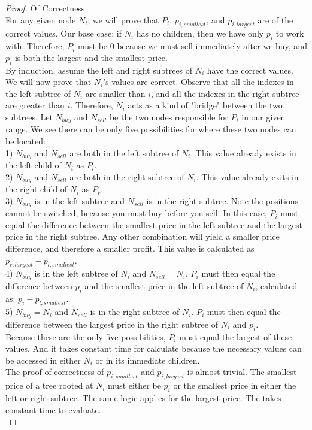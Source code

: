 \documentclass{article}
\theoremstyle{casestyle}
\begin{document}
\begin{proof} Of Correctness\\
  For any given node $N_i$, we will prove that $P_i$, $p_{i, smallest}$, and $p_{i, largest}$ are of the correct values. Our base case: if $N_i$ has no children, then we have only $p_i$ to work with. Therefore, $P_i$ must be $0$ because we must sell immediately after we buy, and $p_i$ is both the largest and the smallest price.\\

  By induction, assume the left and right subtrees of $N_i$ have the correct values. We will now prove that $N_i$'s values are correct. Observe that all the indexes in the left subtree of $N_i$ are smaller than $i$, and all the indexes in the right subtree are greater than $i$. Therefore, $N_i$ acts as a kind of "bridge" between the two subtrees. Let $N_{buy}$ and $N_{sell}$ be the two nodes responsible for $P_i$ in our given range. We see there can be only five possibilities for where these two nodes can be located:\\

  1) $N_{buy}$ and $N_{sell}$ are both in the left subtree of $N_i$. This value already exists in the left child of $N_i$ as $P_l$.\\
  2) $N_{buy}$ and $N_{sell}$ are both in the right subtree of $N_i$. This value already exits in the right child of $N_i$ as $P_r$.\\
  3) $N_{buy}$ is in the left subtree and $N_{sell}$ is in the right subtree. Note the positions cannot be switched, because you must buy before you sell. In this case, $P_i$ must equal the difference between the smallest price in the left subtree and the largest price in the right subtree. Any other combination will yield a smaller price difference, and therefore a smaller profit. This value is calculated as $p_{r, largest} - p_{l, smallest}$.\\
  4) $N_{buy}$ is in the left subtree of $N_i$ and $N_{sell} = N_i$. $P_i$ must then equal the difference between $p_i$ and the smallest price in the left subtree of $N_i$, calculated as: $p_i - p_{l, smallest}. $\\
  5) $N_{buy} = N_i$ and $N_{sell}$ is in the right subtree of $N_i$. $P_i$ must then equal the difference between the largest price in the right subtree of $N_i$ and $p_i$. \\

  Because these are the only five possibilities, $P_i$ must equal the largest of these values. And it takes constant time for calculate because the necessary values can be accessed in either $N_i$ or in its immediate children.\\

  The proof of correctness of $p_{i,smallest}$ and $p_{i, largest}$ is almost trivial. The smallest price of a tree rooted at $N_i$ must either be $p_i$ or the smallest price in either the left or right subtree. The same logic applies for the largest price. The takes constant time to evaluate. \\
\end{proof}
\end{document}
